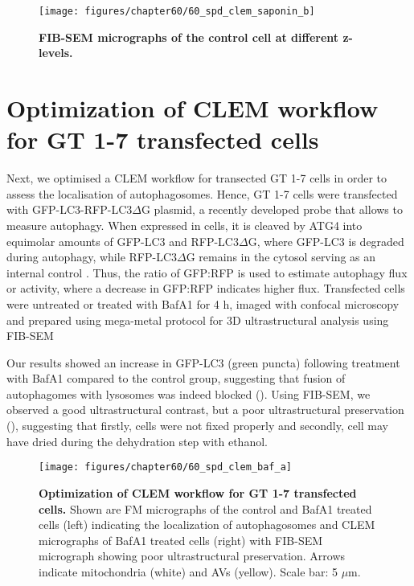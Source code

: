 \begin{landscape}
\begin{figure}[!htbp]
\center
 \texttt{[image: figures/chapter60/60\_spd\_clem\_saponin\_b]}
 \caption[FIB-SEM micrographs of the control cell at different z-levels]{\textbf{FIB-SEM micrographs of the control cell at different z-levels.}}
 \label{fig:60_spd_clem_saponin_b}
\end{figure} 
\end{landscape}

\section{Optimization of CLEM workflow for GT 1-7 transfected cells}
Next, we optimised a CLEM workflow for transected GT 1-7 cells in order to assess the localisation of autophagosomes. Hence, GT 1-7 cells were transfected with GFP-LC3-RFP-LC3$\Delta$G plasmid, a recently developed probe that allows to measure autophagy. When expressed in cells, it is cleaved by ATG4 into equimolar amounts of GFP-LC3 and RFP-LC3$\Delta$G, where GFP-LC3 is degraded during autophagy, while RFP-LC3$\Delta$G remains in the cytosol serving as an internal control \citep{Kaizuka2016}. Thus, the ratio of GFP:RFP is used to estimate autophagy flux or activity, where a decrease in GFP:RFP indicates higher flux. Transfected cells were untreated or treated with BafA1 for 4 h, imaged with confocal microscopy and prepared using mega-metal protocol for 3D ultrastructural analysis using FIB-SEM

Our results showed an increase in GFP-LC3 (green puncta) following treatment with BafA1 compared to the control group, suggesting that fusion of autophagomes with lysosomes was indeed blocked (). Using FIB-SEM, we observed a good ultrastructural contrast, but a poor ultrastructural preservation (), suggesting that firstly, cells were not fixed properly and secondly, cell may have dried during the dehydration step with ethanol. 

\begin{landscape}
\begin{figure}[!htbp]
\center
 \texttt{[image: figures/chapter60/60\_spd\_clem\_baf\_a]}
 \caption[Optimization of CLEM workflow for GT 1-7 transfected cells]{\textbf{Optimization of CLEM workflow for GT 1-7 transfected cells.} Shown are FM micrographs of the control and BafA1 treated cells (left) indicating the localization of autophagosomes and CLEM micrographs of BafA1 treated cells (right) with FIB-SEM micrograph showing poor ultrastructural preservation. Arrows indicate mitochondria (white) and AVs (yellow). Scale bar: 5 $\mu$m.}
 \label{fig:60_spd_clem_baf_a}
\end{figure} 
\end{landscape}

